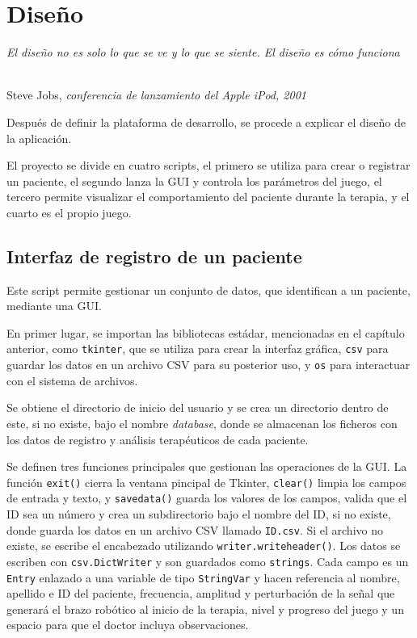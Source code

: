 \chapter{Diseño}
\label{cap:capitulo4}

\begin{flushright}
\begin{minipage}[]{9cm}
\emph{El diseño no es solo lo que se ve y lo que se siente. El diseño es cómo funciona}\\
\end{minipage}\\

Steve Jobs, \textit{conferencia de lanzamiento del Apple iPod, 2001}\\
\end{flushright}

\vspace{1cm}

Después de definir la plataforma de desarrollo, se procede a explicar el diseño de la aplicación.

El proyecto se divide en cuatro scripts, el primero se utiliza para crear o registrar un paciente, el segundo lanza la GUI y controla los parámetros del juego, el tercero permite visualizar el comportamiento del paciente durante la terapia, y el cuarto es el propio juego.

\section{Interfaz de registro de un paciente}
\label{section:registro}

Este script permite gestionar un conjunto de datos, que identifican a un paciente, mediante una GUI.

En primer lugar, se importan las bibliotecas estádar, mencionadas en el capítulo anterior, como \verb|tkinter|, que se utiliza para crear la interfaz gráfica, \verb|csv| para guardar los datos en un archivo CSV para su posterior uso, y \verb|os| para interactuar con el sistema de archivos.

Se obtiene el directorio de inicio del usuario y se crea un directorio dentro de este, si no existe, bajo el nombre \textit{database}, donde se almacenan los ficheros con los datos de registro y análisis terapéuticos de cada paciente.

Se definen tres funciones principales que gestionan las operaciones de la GUI.
La función \verb|exit()| cierra la ventana pincipal de Tkinter, \verb|clear()| limpia los campos de entrada y texto, y \verb|savedata()| guarda los valores de los campos, valida que el ID sea un número y crea un subdirectorio bajo el nombre del ID, si no existe, donde guarda los datos en un archivo CSV llamado \verb|ID.csv|.
Si el archivo no existe, se escribe el encabezado utilizando \verb|writer.writeheader()|.
Los datos se escriben con \verb|csv.DictWriter| y son guardados como \verb|strings|.
Cada campo es un \verb|Entry| enlazado a una variable de tipo \verb|StringVar| y hacen referencia al nombre, apellido e ID del paciente, frecuencia, amplitud y perturbación de la señal que generará el brazo robótico al inicio de la terapia, nivel y progreso del juego y un espacio para que el doctor incluya observaciones.

